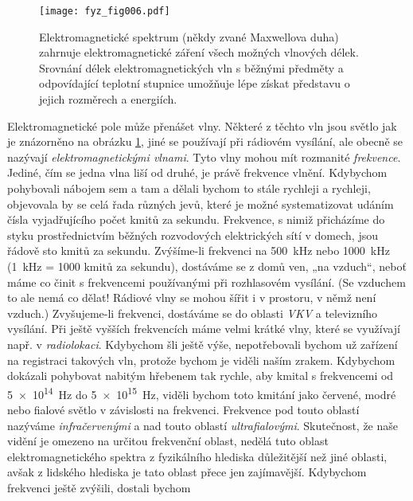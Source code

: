 {    \begin{figure}[ht!] %
      \centering
      \texttt{[image: fyz\_fig006.pdf]}
      \caption{Elektromagnetické spektrum (někdy zvané Maxwellova duha) zahrnuje elektromagnetické 
               záření všech možných vlnových délek. Srovnání délek elektromagnetických vln s 
               běžnými předměty a odpovídající teplotní stupnice umožňuje lépe získat představu o 
               jejich rozměrech a energiích.}
      \label{fyz:fig006}
    \end{figure}
    
    Elektromagnetické pole může přenášet vlny. Některé z těchto vln jsou světlo jak je znázorněno 
    na obrázku \ref{fyz:fig006}, jiné se používají při rádiovém vysílání, ale obecně se 
    nazývají \emph{elektromagnetickými vlnami}. Tyto vlny mohou mít rozmanité \emph{frekvence}. 
    Jediné, čím se jedna vlna liší od druhé, je právě frekvence vlnění. Kdybychom pohybovali 
    nábojem sem a tam a dělali bychom to stále rychleji a rychleji, objevovala by se celá řada 
    různých jevů, které je možné systematizovat udáním čísla vyjadřujícího počet kmitů za sekundu. 
    Frekvence, s nimiž přicházíme do styku prostřednictvím běžných rozvodových elektrických sítí v 
    domech, jsou řádově sto kmitů za sekundu. Zvýšíme-li frekvenci na \SI{500}{\kHz} nebo 
    \SI{1000}{\kHz} (\SI{1}{\kHz} = 1000 kmitů za sekundu), dostáváme se z domů ven, „na 
    vzduch“, neboť máme co činit s frekvencemi používanými při rozhlasovém vysílání. (Se vzduchem 
    to ale nemá co dělat! Rádiové vlny se mohou šířit i v prostoru, v němž není vzduch.) 
    Zvyšujeme-li frekvenci, dostáváme se do oblasti \emph{VKV} a televizního vysílání. Při ještě 
    vyšších frekvencích máme velmi krátké vlny, které se využívají např. v \emph{radiolokaci}. 
    Kdybychom šli ještě výše, nepotřebovali bychom už zařízení na registraci takových vln, protože 
    bychom je viděli naším zrakem. Kdybychom dokázali pohybovat nabitým hřebenem tak rychle, aby 
    kmital s frekvencemi od \SI{5e14}{\Hz} do \SI{5e15}{\Hz}, viděli bychom toto kmitání jako 
    červené, modré nebo fialové světlo v závislosti na frekvenci. Frekvence pod touto oblastí 
    nazýváme \emph{infračervenými} a nad touto oblastí \emph{ultrafialovými}. Skutečnost, 
    že naše vidění je omezeno na určitou frekvenční oblast, nedělá tuto oblast elektromagnetického 
    spektra z fyzikálního hlediska důležitější než jiné oblasti, avšak z lidského hlediska je tato 
    oblast přece jen zajímavější. Kdybychom frekvenci ještě zvýšili, dostali bychom 
}
